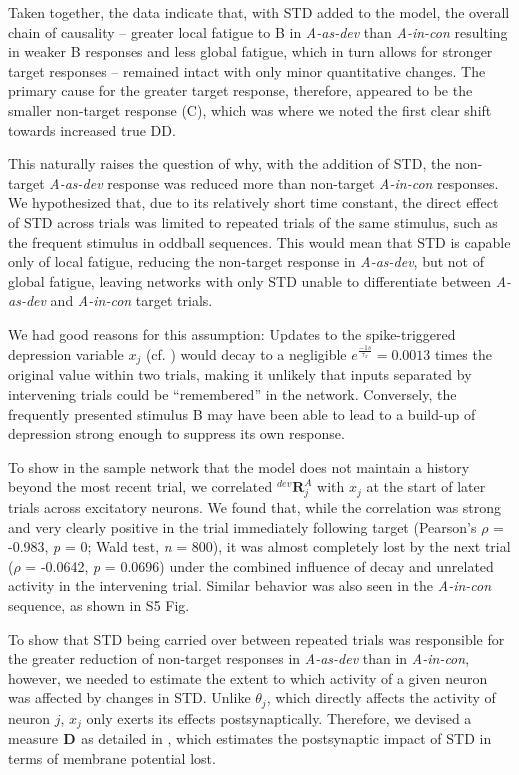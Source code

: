 \documentclass[9pt,lineno,onehalfspacing]{elife}
\newcommand{\dev}{\textit{A-as-dev}}
\newcommand{\msc}{\textit{A-in-con}}
\newcommand{\R}[3][]{{}^{#1}_{}\boldsymbol R^{#2}_{#3}}
\newcommand{\D}[3][]{{}^{#1}_{}\boldsymbol D^{#2}_{#3}}
\begin{document}
Taken together, the data indicate that, with STD added to the model, the overall chain of causality -- greater local fatigue to B in \dev{} than \msc{} resulting in weaker B responses and less global fatigue, which in turn allows for stronger target responses -- remained intact with only minor quantitative changes. The primary cause for the greater target response, therefore, appeared to be the smaller non-target response (C), which was where we noted the first clear shift towards increased true DD.

This naturally raises the question of why, with the addition of STD, the non-target \dev{} response was reduced more than non-target \msc{} responses. We hypothesized that, due to its relatively short time constant, the direct effect of STD across trials was limited to repeated trials of the same stimulus, such as the frequent stimulus in oddball sequences. This would mean that STD is capable only of local fatigue, reducing the non-target response in \dev{}, but not of global fatigue, leaving networks with only STD unable to differentiate between \dev{} and \msc{} target trials.

We had good reasons for this assumption: Updates to the spike-triggered depression variable $x_j$ (cf. ) would decay to a negligible $e^\frac{-1 s}{\tau_x} = 0.0013$ times the original value within two trials, making it unlikely that inputs separated by intervening trials could be ``remembered'' in the network. Conversely, the frequently presented stimulus B may have been able to lead to a build-up of depression strong enough to suppress its own response.

To show in the sample network that the model does not maintain a history beyond the most recent trial, we correlated $\R[dev]{A}{j}$ with $x_j$ at the start of later trials across excitatory neurons. We found that, while the correlation was strong and very clearly positive in the trial immediately following target (Pearson's $\rho$ = -0.983, \textit{p} = 0; Wald test, \textit{n} = 800), it was almost completely lost by the next trial ($\rho$ = -0.0642, \textit{p} = 0.0696) under the combined influence of decay and unrelated activity in the intervening trial. Similar behavior was also seen in the \msc{} sequence, as shown in S5 Fig.

To show that STD being carried over between repeated trials was responsible for the greater reduction of non-target responses in \dev{} than in \msc{}, however, we needed to estimate the extent to which activity of a given neuron was affected by changes in STD. Unlike $\theta_j$, which directly affects the activity of neuron $j$, $x_j$ only exerts its effects postsynaptically. Therefore, we devised a measure $\D{}{}$ as detailed in , which estimates the postsynaptic impact of STD in terms of membrane potential lost.
\end{document}
